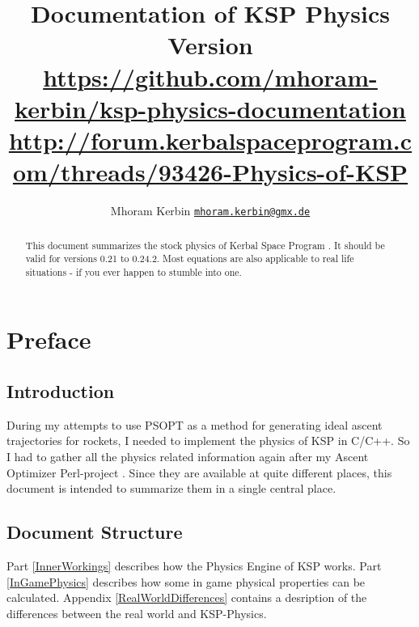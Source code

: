 \documentclass[11pt]{report}
\begin{document}
\title{Documentation of KSP Physics\\\small{Version }\\\vspace{1 em}\url{https://github.com/mhoram-kerbin/ksp-physics-documentation}\\\url{http://forum.kerbalspaceprogram.com/threads/93426-Physics-of-KSP}}
\author {Mhoram Kerbin \href{mailto:mhoram.kerbin@gmx.de}{\nolinkurl{mhoram.kerbin@gmx.de}}}

\maketitle

\begin{abstract}

  This document summarizes the stock physics of Kerbal Space Program
  \cite{KSP}. It should be valid for versions 0.21 to 0.24.2. Most
  equations are also applicable to real life situations - if you ever
  happen to stumble into one.

\end{abstract}

\tableofcontents

\chapter{Preface}

\section{Introduction}

During my attempts to use PSOPT as a method for generating ideal
ascent trajectories for rockets, I needed to implement the physics of
KSP in C/C++. So I had to gather all the physics related information
again after my Ascent Optimizer Perl-project \cite{PAO}. Since they
are available at quite different places, this document is intended to
summarize them in a single central place.

\section{Document Structure}

Part \ref{InnerWorkings} describes how the Physics Engine of KSP
works. Part \ref{InGamePhysics} describes how some in game physical
properties can be calculated. Appendix \ref{RealWorldDifferences}
contains a desription of the differences between the real world and
KSP-Physics.
\end{document}
